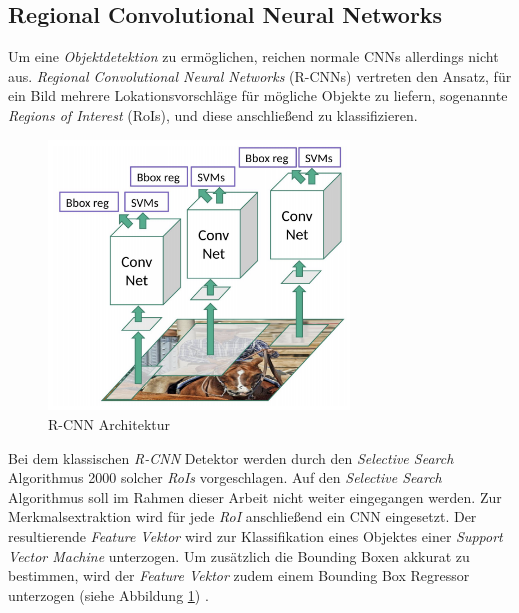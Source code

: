\subsection*{Regional Convolutional Neural Networks}

Um eine \textit{Objektdetektion} zu ermöglichen, reichen normale CNNs allerdings nicht aus. \textit{Regional Convolutional Neural Networks} (R-CNNs) vertreten den Ansatz, für ein Bild mehrere Lokationsvorschläge für mögliche Objekte zu liefern, sogenannte \textit{Regions of Interest} (RoIs), und diese anschließend zu klassifizieren. 

\begin{figure}[ht]
	\begin{center}
		\includegraphics[width=8cm]{Bilder/rcnn.png} 
		\caption[R-CNN Architektur]{R-CNN Architektur \cite{RohithGandhi.20180709}}
		\label{rcnn}
	\end{center}
\end{figure}

Bei dem klassischen \textit{R-CNN} Detektor werden durch den \textit{Selective Search} Algorithmus 2000 solcher \textit{RoIs} vorgeschlagen. Auf den \textit{Selective Search} Algorithmus soll im Rahmen dieser Arbeit nicht weiter eingegangen werden. Zur Merkmalsextraktion wird für jede \textit{RoI} anschließend ein CNN eingesetzt. Der resultierende \textit{Feature Vektor} wird zur Klassifikation eines Objektes einer \textit{Support Vector Machine} unterzogen. Um zusätzlich die Bounding Boxen akkurat zu bestimmen, wird der \textit{Feature Vektor} zudem einem Bounding Box Regressor unterzogen (siehe Abbildung \ref{rcnn}) \cite{RohithGandhi.20180709}. 

